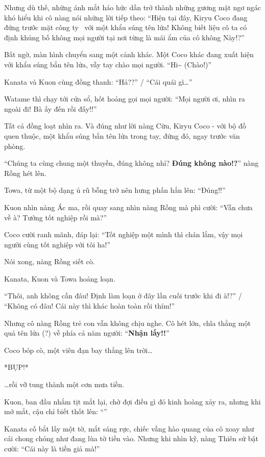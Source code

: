 \documentclass[../main.tex]{subfiles}
\begin{document}

Nhưng dù thế, những ánh mắt háo hức dần trở thành những gương mặt ngơ ngác khó hiểu khi cô nàng nói những lời tiếp theo: ``Hiện tại đây, Kiryu Coco đang đứng trước mặt công ty \hll\ với một khẩu súng tên lửa! Không biết liệu cô ta có định khủng bố không mọi người tại nơi từng là mái ẩm của cô không Này!?''

Bất ngờ, màn hình chuyển sang một cảnh khác. Một Coco khác đang xuất hiện với khẩu súng bắn tên lửa, vẫy tay chào mọi người. ``Hi\~{} (Chào!)''


Kanata và Kuon cùng đồng thanh: ``Hả??'' / ``Cái quái gì\dots''

Watame thì chạy tới cửa sổ, hốt hoảng gọi mọi người: ``Mọi người ơi, nhìn ra ngoài đi! Bà ấy đến rồi đấy!!''

Tất cả đồng loạt nhìn ra. Và đúng như lời nàng Cừu, Kiryu Coco - với bộ đồ quen thuộc, một khẩu súng bắn tên lửa trong tay, đứng đó, ngay trước văn phòng.

``Chúng ta cùng chung một thuyền, đúng không nhỉ? \textbf{Đúng không nào!?}'' nàng Rồng hét lên.

Towa, từ một bộ dạng ủ rũ bỗng trở nên hưng phấn hẳn lên: ``Đúng!!''

Kuon nhìn nàng Ác ma, rồi quay sang nhìn nàng Rồng mà phì cười: ``Vẫn chưa về à? Tưởng tốt nghiệp rồi mà?''

Coco cười ranh mãnh, đáp lại: ``Tốt nghiệp một mình thì chán lắm, vậy mọi người cùng tốt nghiệp với tôi ha!''

Nói xong, nàng Rồng siết cò.

Kanata, Kuon và Towa hoảng loạn.

``Thôi, anh không cần đâu! Định làm loạn ở đây lần cuối trước khi đi à!?'' / ``Không có đâu! Cái này thì khác hoàn toàn rồi thím!''

Nhưng cô nàng Rồng trẻ con vẫn không chịu nghe. Cô hét lớn, chĩa thẳng một quả tên lửa (?) về phía cả năm người: ``\textbf{Nhận lấy!!}''

Coco bóp cò, một viên đạn bay thẳng lên trời\dots

*BỤP!*

\dots rồi vỡ tung thành một cơn mưa tiền.

Kuon, ban đầu nhắm tịt mắt lại, chờ đợi điều gì đó kinh hoàng xảy ra, nhưng khi mở mắt, cậu chỉ biết thốt lên: ``''

Kanata cố bắt lấy một tờ, mắt sáng rực, chiếc vầng hào quang của cô xoay như cái chong chóng như đang lùa tờ tiền vào. Nhưng khi nhìn kỹ, nàng Thiên sứ bật cười: ``Cái này là tiền giả mà!''
\end{document}
